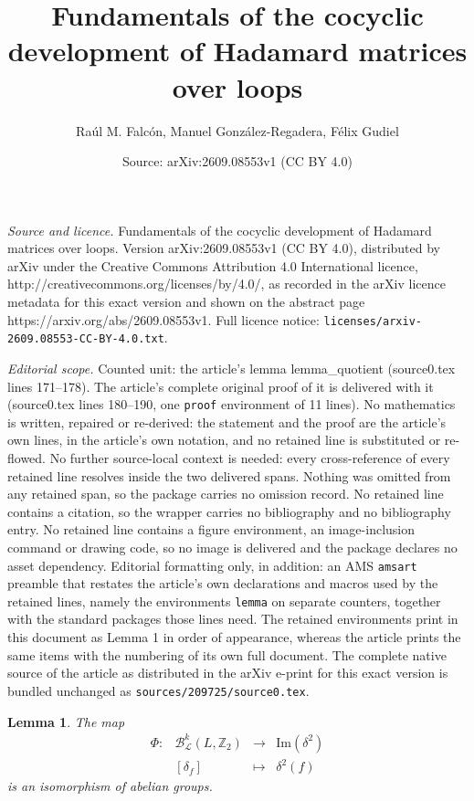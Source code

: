 \documentclass[10pt,a4paper]{amsart}
\title{Fundamentals of the cocyclic development of Hadamard matrices over loops}
\author{Ra\'ul M. Falc\'on, Manuel Gonz\'alez-Regadera, F\'elix Gudiel}
\date{Source: arXiv:2609.08553v1 (CC BY 4.0)}
\newtheorem{lemma}{Lemma}
\begin{document}
\maketitle

\noindent\emph{Source and licence.} Fundamentals of the cocyclic development of Hadamard matrices over loops. Version arXiv:2609.08553v1 (CC BY 4.0), distributed by arXiv under the Creative Commons Attribution 4.0 International licence, http://creativecommons.org/licenses/by/4.0/, as recorded in the arXiv licence metadata for this exact version and shown on the abstract page https://arxiv.org/abs/2609.08553v1. Full licence notice: \texttt{licenses/arxiv-2609.08553-CC-BY-4.0.txt}.\par\smallskip

\noindent\textit{Editorial scope.} Counted unit: the article's lemma lemma\_quotient (source0.tex lines 171--178). The article's complete original proof of it is delivered with it (source0.tex lines 180--190, one \texttt{proof} environment of 11 lines). No mathematics is written, repaired or re-derived: the statement and the proof are the article's own lines, in the article's own notation, and no retained line is substituted or re-flowed.  No further source-local context is needed: every cross-reference of every retained line resolves inside the two delivered spans.  Nothing was omitted from any retained span, so the package carries no omission record.  No retained line contains a citation, so the wrapper carries no bibliography and no bibliography entry.  No retained line contains a figure environment, an image-inclusion command or drawing code, so no image is delivered and the package declares no asset dependency.  Editorial formatting only, in addition: an AMS \texttt{amsart} preamble that restates the article's own declarations and macros used by the retained lines, namely the environments \texttt{lemma} on separate counters, together with the standard packages those lines need.  The retained environments print in this document as Lemma 1 in order of appearance, whereas the article prints the same items with the numbering of its own full document.  The complete native source of the article as distributed in the arXiv e-print for this exact version is bundled unchanged as \texttt{sources/209725/source0.tex}.
\begin{lemma}\label{lemma_quotient}
The map
\[\begin{array}{cccc}
\Phi: & \mathcal{B}_{\mathcal{L}}^k(L,\mathbb{Z}_2)& \to & \mathrm{Im}(\delta^2)\\
& [\delta_f] &\mapsto & \delta^2(f)
\end{array}\]
is an isomorphism of abelian groups.
\end{lemma}
\end{document}

